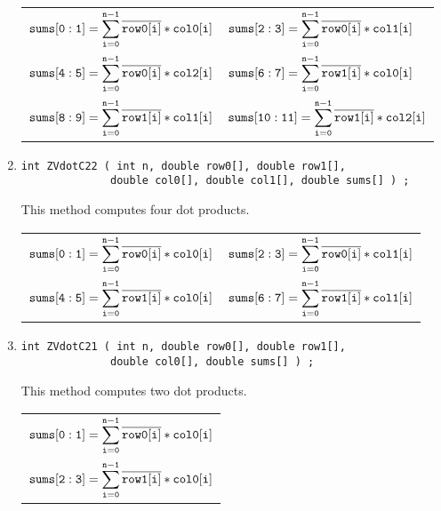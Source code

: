 \begin{enumerate}
\par
\begin{tabular}{ll}
$\displaystyle{\tt sums[0:1]}
= \sum_{\tt i = 0}^{\tt n-1} \overline{\tt row0[i]} * {\tt col0[i]}$ &
$\displaystyle{\tt sums[2:3]}
= \sum_{\tt i = 0}^{\tt n-1} \overline{\tt row0[i]} * {\tt col1[i]}$ \\
$\displaystyle{\tt sums[4:5]}
= \sum_{\tt i = 0}^{\tt n-1} \overline{\tt row0[i]} * {\tt col2[i]}$ &
$\displaystyle{\tt sums[6:7]}
= \sum_{\tt i = 0}^{\tt n-1} \overline{\tt row1[i]} * {\tt col0[i]}$ \\
$\displaystyle{\tt sums[8:9]}
= \sum_{\tt i = 0}^{\tt n-1} \overline{\tt row1[i]} * {\tt col1[i]}$ &
$\displaystyle{\tt sums[10:11]}
= \sum_{\tt i = 0}^{\tt n-1} \overline{\tt row1[i]} * {\tt col2[i]}$ 
\end{tabular}
\item
\begin{verbatim}
int ZVdotC22 ( int n, double row0[], double row1[], 
              double col0[], double col1[], double sums[] ) ;
\end{verbatim}
This method computes four dot products.
\par
\begin{tabular}{ll}
$\displaystyle{\tt sums[0:1]}
= \sum_{\tt i = 0}^{\tt n-1} \overline{\tt row0[i]} * {\tt col0[i]}$ &
$\displaystyle{\tt sums[2:3]}
= \sum_{\tt i = 0}^{\tt n-1} \overline{\tt row0[i]} * {\tt col1[i]}$ \\
$\displaystyle{\tt sums[4:5]}
= \sum_{\tt i = 0}^{\tt n-1} \overline{\tt row1[i]} * {\tt col0[i]}$ &
$\displaystyle{\tt sums[6:7]}
= \sum_{\tt i = 0}^{\tt n-1} \overline{\tt row1[i]} * {\tt col1[i]}$ 
\end{tabular}
\item
\begin{verbatim}
int ZVdotC21 ( int n, double row0[], double row1[], 
              double col0[], double sums[] ) ;
\end{verbatim}
This method computes two dot products.
\par
\begin{tabular}{l}
$\displaystyle{\tt sums[0:1]}
= \sum_{\tt i = 0}^{\tt n-1} \overline{\tt row0[i]} * {\tt col0[i]}$ \\
$\displaystyle{\tt sums[2:3]}
= \sum_{\tt i = 0}^{\tt n-1} \overline{\tt row1[i]} * {\tt col0[i]}$ 

\end{tabular}
\end{enumerate}
